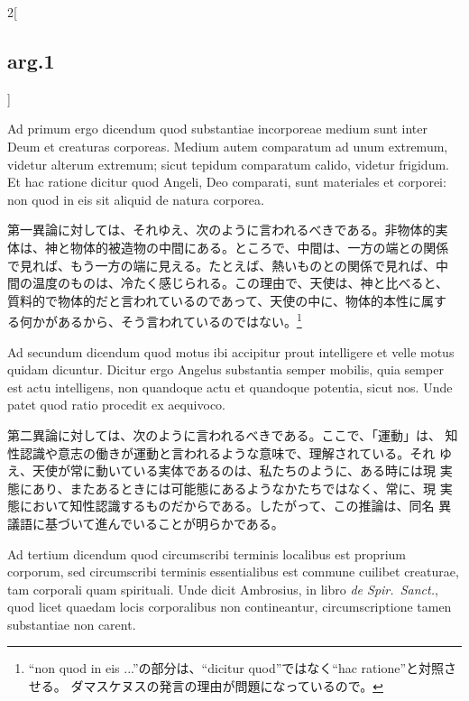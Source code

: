 \documentclass[paper=a4paper,fontsize=10pt,jafontsize=9pt,titlepage]{jlreq}
\begin{document}
\begin{paracol}{2}[\subsection{arg.1}]
\switchcolumn*[\subsection{ad.1}]

Ad primum ergo dicendum quod substantiae incorporeae medium sunt inter
Deum et creaturas corporeas. Medium autem comparatum ad unum extremum,
videtur alterum extremum; sicut tepidum comparatum calido, videtur
frigidum. Et hac ratione dicitur quod Angeli, Deo comparati, sunt
materiales et corporei: non quod in eis sit aliquid de natura
corporea.

\switchcolumn

第一異論に対しては、それゆえ、次のように言われるべきである。非物体的実
体は、神と物体的被造物の中間にある。ところで、中間は、一方の端との関係
で見れば、もう一方の端に見える。たとえば、熱いものとの関係で見れば、中
間の温度のものは、冷たく感じられる。この理由で、天使は、神と比べると、
質料的で物体的だと言われているのであって、天使の中に、物体的本性に属す
る何かがあるから、そう言われているのではない。\footnote{ ``non quod in
eis ...''の部分は、``dicitur quod''ではなく``hac ratione''と対照させる。
ダマスケヌスの発言の理由が問題になっているので。}

\switchcolumn*[\subsection{ad.2}]

Ad secundum dicendum quod motus ibi accipitur prout intelligere et
velle motus quidam dicuntur. Dicitur ergo Angelus substantia semper
mobilis, quia semper est actu intelligens, non quandoque actu et
quandoque potentia, sicut nos. Unde patet quod ratio procedit ex
aequivoco.

\switchcolumn

第二異論に対しては、次のように言われるべきである。ここで、「運動」は、
知性認識や意志の働きが運動と言われるような意味で、理解されている。それ
ゆえ、天使が常に動いている実体であるのは、私たちのように、ある時には現
実態にあり、またあるときには可能態にあるようなかたちではなく、常に、現
実態において知性認識するものだからである。したがって、この推論は、同名
異議語に基づいて進んでいることが明らかである。

\switchcolumn*[\subsection{ad.3}]

Ad tertium dicendum quod circumscribi terminis localibus est proprium
corporum, sed circumscribi terminis essentialibus est commune cuilibet
creaturae, tam corporali quam spirituali. Unde dicit Ambrosius, in
libro {\itshape de Spir.~Sanct.}, quod licet quaedam locis
corporalibus non contineantur, circumscriptione tamen substantiae non
carent.


\end{paracol}
\end{document}
